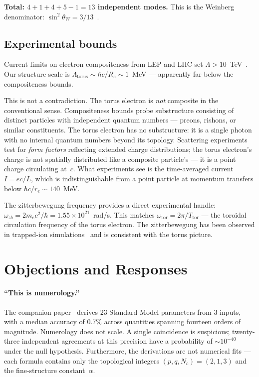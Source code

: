 \documentclass[11pt,a4paper]{article}
\begin{document}
\textbf{Total: $4 + 1 + 4 + 5 - 1 = 13$ independent modes.} This is the Weinberg denominator: $\sin^2\theta_W = 3/13$~\cite{paper1}.

\subsection{Experimental bounds}

Current limits on electron compositeness from LEP and LHC set $\Lambda > 10$~TeV~\cite{pdg2022}. Our structure scale is $\Lambda_{\text{torus}} \sim \hbar c/R_e \sim 1$~MeV --- apparently far below the compositeness bounds.

This is not a contradiction. The torus electron is \emph{not} composite in the conventional sense. Compositeness bounds probe substructure consisting of distinct particles with independent quantum numbers --- preons, rishons, or similar constituents. The torus electron has no substructure: it is a single photon with no internal quantum numbers beyond its topology. Scattering experiments test for \emph{form factors} reflecting extended charge distributions; the torus electron's charge is not spatially distributed like a composite particle's --- it is a point charge circulating at~$c$. What experiments see is the time-averaged current $I = ec/L$, which is indistinguishable from a point particle at momentum transfers below $\hbar c/r_e \sim 140$~MeV.

The zitterbewegung frequency provides a direct experimental handle: $\omega_{zb} = 2m_e c^2/\hbar = 1.55 \times 10^{21}$~rad/s. This matches $\omega_{\text{tor}} = 2\pi/T_{\text{tor}}$ --- the toroidal circulation frequency of the torus electron. The zitterbewegung has been observed in trapped-ion simulations~\cite{gerritsma2010} and is consistent with the torus picture.

\section{Objections and Responses}
\label{sec:objections}

\paragraph{``This is numerology.''}
The companion paper~\cite{paper1} derives 23 Standard Model parameters from 3 inputs, with a median accuracy of 0.7\% across quantities spanning fourteen orders of magnitude. Numerology does not scale. A single coincidence is suspicious; twenty-three independent agreements at this precision have a probability of $\sim 10^{-40}$ under the null hypothesis. Furthermore, the derivations are not numerical fits --- each formula contains only the topological integers $(p, q, N_c) = (2, 1, 3)$ and the fine-structure constant~$\alpha$.
\end{document}
